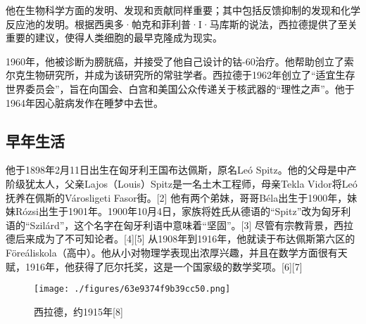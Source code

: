 他在生物科学方面的发明、发现和贡献同样重要；其中包括反馈抑制的发现和化学反应池的发明。根据西奥多·帕克和菲利普·I·马库斯的说法，西拉德提供了至关重要的建议，使得人类细胞的最早克隆成为现实。

1960年，他被诊断为膀胱癌，并接受了他自己设计的钴-60治疗。他帮助创立了索尔克生物研究所，并成为该研究所的常驻学者。西拉德于1962年创立了“适宜生存世界委员会”，旨在向国会、白宫和美国公众传递关于核武器的“理性之声”。他于1964年因心脏病发作在睡梦中去世。
\subsection{早年生活}  
他于1898年2月11日出生在匈牙利王国布达佩斯，原名Leó Spitz。他的父母是中产阶级犹太人，父亲Lajos（Louis）Spitz是一名土木工程师，母亲Tekla Vidor将Leó抚养在佩斯的Városligeti Fasor街。[2] 他有两个弟妹，哥哥Béla出生于1900年，妹妹Rózsi出生于1901年。1900年10月4日，家族将姓氏从德语的“Spitz”改为匈牙利语的“Szilárd”，这个名字在匈牙利语中意味着“坚固”。[3] 尽管有宗教背景，西拉德后来成为了不可知论者。[4][5] 从1908年到1916年，他就读于布达佩斯第六区的Föreáliskola（高中）。他从小对物理学表现出浓厚兴趣，并且在数学方面很有天赋，1916年，他获得了厄尔托奖，这是一个国家级的数学奖项。[6][7]
\begin{figure}[ht]
\centering
\texttt{[image: ./figures/63e9374f9b39cc50.png]}
\caption{西拉德，约1915年[8]} \label{fig_Szilar_2}
\end{figure}